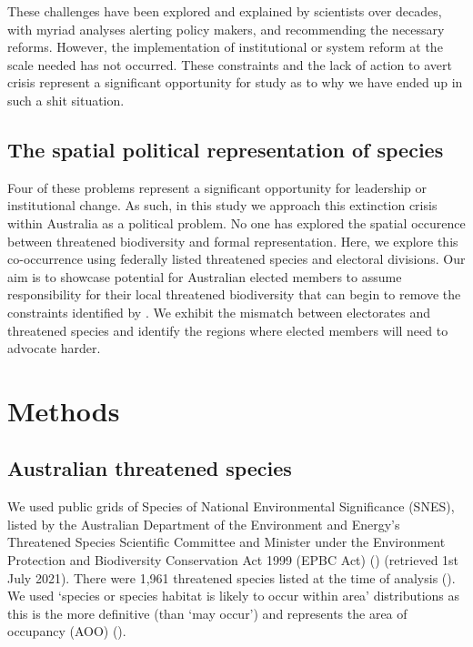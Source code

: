 \documentclass[a4paper,11pt]{article}
\begin{document}
These challenges have been explored and explained by scientists over decades, with myriad analyses alerting policy makers, and recommending the necessary reforms. However, the implementation of institutional or system reform at the scale needed has not occurred. These constraints and the lack of action to avert crisis represent a significant opportunity for study as to why we have ended up in such a shit situation. 

\subsection{The spatial political representation of species}

Four of these problems represent a significant opportunity for leadership or institutional change. As such, in this study we approach this extinction crisis within Australia as a political problem. No one has explored the spatial occurence between threatened biodiversity and formal representation. Here, we explore this co-occurrence using federally listed threatened species and electoral divisions. Our aim is to showcase potential for Australian elected members to assume responsibility for their local threatened biodiversity that can begin to remove the constraints identified by \cite{leggeMonitoringThreatenedSpecies2018}. We exhibit the mismatch between electorates and threatened species and identify the regions where elected members will need to advocate harder.

\section{Methods}

\subsection{Australian threatened species}

We used public grids of Species of National Environmental Significance (SNES), listed by the Australian Department of the Environment and Energy’s Threatened Species Scientific Committee and Minister under the Environment Protection and Biodiversity Conservation Act 1999 (EPBC Act) (\cite{commonwealthofaustraliaThreatenedSpeciesEPBC2021}) (retrieved 1st July 2021). There were 1,961 threatened species listed at the time of analysis (\cite{commonwealthofaustraliaThreatenedSpeciesEPBC2021}). We used ‘species or species habitat is likely to occur within area’ distributions as this is the more definitive (than ‘may occur’) and represents the area of occupancy (AOO) (\cite{gastonSizesSpeciesGeographic2009}).
\end{document}
